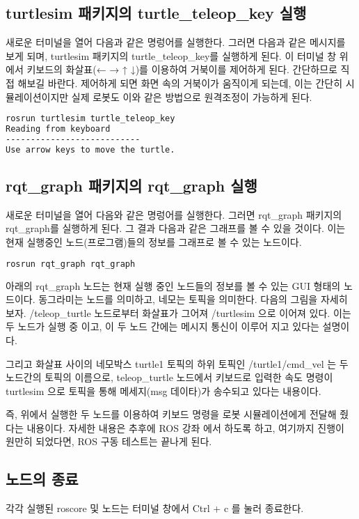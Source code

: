 \subsection{turtlesim 패키지의 turtle\_teleop\_key 실행}
새로운 터미널을 열어 다음과 같은 명렁어를 실행한다. 그러면 다음과 같은 메시지를 보게 되며, turtlesim 패키지의 turtle\_teleop\_key를 실행하게 된다. 이 터미널 창 위에서 키보드의 화살표(← → ↑ ↓)를 이용하여 거북이를 제어하게 된다. 간단하므로 직접 해보길 바란다. 제어하게 되면 화면 속의 거북이가 움직이게 되는데, 이는 간단히 시뮬레이션이지만 실제 로봇도 이와 같은 방법으로 원격조정이 가능하게 된다.

\begin{lstlisting}[language=bash]
rosrun turtlesim turtle_teleop_key
Reading from keyboard
---------------------------
Use arrow keys to move the turtle.
\end{lstlisting}

\subsection{rqt\_graph 패키지의 rqt\_graph 실행}
새로운 터미널을 열어 다음와 같은 명렁어를 실행한다. 그러면 rqt\_graph 패키지의 rqt\_graph를 실행하게 된다. 그 결과 다음과 같은 그래프를 볼 수 있을 것이다. 이는 현재 실행중인 노드(프로그램)들의 정보를 그래프로 볼 수 있는 노드이다.

\begin{lstlisting}[language=bash]
rosrun rqt_graph rqt_graph
\end{lstlisting}

아래의 rqt\_graph 노드는 현재 실행 중인 노드들의 정보를 볼 수 있는 GUI 형태의 노드이다. 동그라미는 노드를 의미하고, 네모는 토픽을 의미한다. 다음의 그림을 자세히 보자. /teleop\_turtle 노드로부터 화살표가 그어져 /turtlesim 으로 이어져 있다. 이는 두 노드가 실행 중 이고, 이 두 노드 간에는 메시지 통신이 이루어 지고 있다는 설명이다. 

그리고 화살표 사이의 네모박스 turtle1 토픽의 하위 토픽인 /turtle1/cmd\_vel 는 두 노드간의 토픽의 이름으로, teleop\_turtle 노드에서 키보드로 입력한 속도 명령이 turtlesim 으로 토픽을 통해 메세지(msg 데이타)가 송수되고 있다는 내용이다. 

즉, 위에서 실행한 두 노드를 이용하여 키보드 명령을 로봇 시뮬레이션에게 전달해 줬다는 내용이다. 자세한 내용은 추후에 ROS 강좌 에서 하도록 하고, 여기까지 진행이 원만히 되었다면, ROS 구동 테스트는 끝나게 된다.

\subsection{노드의 종료}

각각 실행된 roscore 및 노드는 터미널 창에서 Ctrl + c 를 눌러 종료한다.

